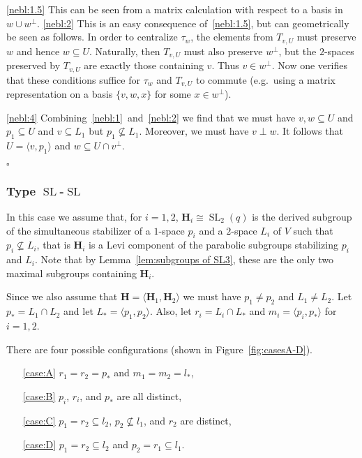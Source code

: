 \documentclass[12pt]{amsart}
\theoremstyle{definition}
\newcommand{\epf}{\qed}
\newcommand{\sbe}{\subseteq}
\DeclareMathOperator{\SL}{SL}
\renewcommand{\qed}{\hfill $\square$}
\newcommand{\amgrpH}{{\mathbf{H}}}
\begin{document}
\eqref{nebl:1.5} This can be seen from a matrix calculation with respect to a basis in $w\cup w^\perp$.
\eqref{nebl:2} This is an easy consequence of~\eqref{nebl:1.5}, but can geometrically be seen as follows. 
In order to centralize $\tau_w$, the elements from $T_{v,U}$ must preserve $w$ and hence $w\sbe U$.
Naturally, then $T_{v,U}$ must also preserve $w^\perp$, but the $2$-spaces preserved by $T_{v,U}$ are exactly those containing $v$. Thus $v\in w^\perp$.
Now one verifies that these conditions suffice for $\tau_w$ and $T_{v,U}$ to commute (e.g.~using a matrix representation on a basis $\{v,w,x\}$ for some $x\in w^\perp$).

\eqref{nebl:4}
Combining~\eqref{nebl:1}~and~\eqref{nebl:2} we find that we must have $v,w\sbe U$ and $p_1\sbe U$ and $v\sbe L_1$ but $p_1\not\sbe L_1$. Moreover, we must have $v\perp w$.
It follows that $U=\langle v,p_1\rangle$ and $w\sbe U\cap v^\perp$.


\epf

\subsubsection{Type $\SL$-$\SL$}\label{subsub:SLSL}
In this case we assume that, for $i=1,2$,  $\amgrpH_i\cong\SL_2(q)$ is the derived subgroup of the simultaneous stabilizer of a $1$-space $p_i$ and a $2$-space $L_i$ of $V$ such that $p_i\not\sbe L_i$, that is $\amgrpH_i$ is a Levi component of the parabolic subgroups stabilizing $p_i$ and $L_i$.
Note that by Lemma~\ref{lem:subgroups of SL3}, these are the only two maximal subgroups containing $\amgrpH_i$.

Since we also assume that $\amgrpH=\langle \amgrpH_1,\amgrpH_2\rangle$ we must have $p_1\ne p_2$ and $L_1\ne L_2$. Let $p_*=L_1\cap L_2$ and let $L_*=\langle p_1,p_2\rangle$.
Also, let $r_i=L_i\cap L_*$ and $m_i=\langle p_i,p_*\rangle$ for $i=1,2$.

There are four possible configurations (shown in Figure~\ref{fig:casesA-D}).
\begin{enumerate}
\item[\ref{case:A}] $r_1=r_2=p_*$ and $m_1=m_2=l_*$,
\item[\ref{case:B}] $p_i$, $r_i$, and $p_*$ are all distinct,
\item[\ref{case:C}]  $p_1=r_2\sbe l_2$, $p_2\not\sbe l_1$, and $r_2$ are distinct,
\item[\ref{case:D}] $p_1=r_2\sbe l_2$ and $p_2=r_1\sbe l_1$.
\end{enumerate} 
\end{document}
